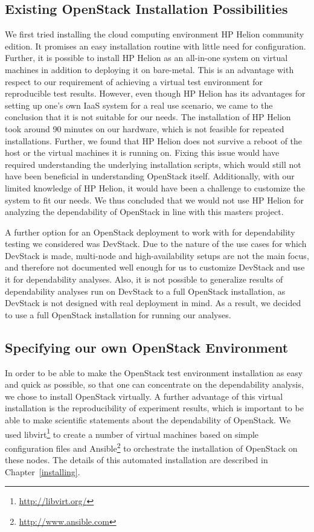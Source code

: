 \documentclass[conference]{IEEEtran}
\begin{document}
\subsection{Existing OpenStack Installation Possibilities}
\label{installpossibilities}
We first tried installing the cloud computing environment HP Helion community edition. It promises an easy installation routine with little need for configuration. Further, it is possible to install HP Helion as an all-in-one system on virtual machines in addition to deploying it on bare-metal. This is an advantage with respect to our requirement of achieving a virtual test environment for reproducible test results. However, even though HP Helion has its advantages for setting up one's own IaaS system for a real use scenario, we came to the conclusion that it is not suitable for our needs. The installation of HP Helion took around 90 minutes on our hardware, which is not feasible for repeated installations. Further, we found that HP Helion does not survive a reboot of the host or the virtual machines it is running on. Fixing this issue would have required understanding the underlying installation scripts, which would still not have been beneficial in understanding OpenStack itself. Additionally, with our limited knowledge of HP Helion, it would have been a challenge to customize the system to fit our needs. We thus concluded that we would not use HP Helion for analyzing the dependability of OpenStack in line with this masters project.

A further option for an OpenStack deployment to work with for dependability testing we considered was DevStack. Due to the nature of the use cases for which DevStack is made, multi-node and high-availability setups are not the main focus, and therefore not documented well enough for us to customize DevStack and use it for dependability analyses. Also, it is not possible to generalize results of dependability analyses run on DevStack to a full OpenStack installation, as DevStack is not designed with real deployment in mind. As a result, we decided to use a full OpenStack installation for running our analyses.

\subsection{Specifying our own OpenStack Environment}
\label{environment}
In order to be able to make the OpenStack test environment installation as easy and quick as possible, so that one can concentrate on the dependability analysis, we chose to install OpenStack virtually. A further advantage of this virtual installation is the reproducibility of experiment results, which is important to be able to make scientific statements about the dependability of OpenStack. We used libvirt\footnote{\url{http://libvirt.org/}} to create a number of virtual machines based on simple configuration files and Ansible\footnote{\url{http://www.ansible.com}} to orchestrate the installation of OpenStack on these nodes. The details of this automated installation are described in Chapter~\ref{installing}.
\end{document}
